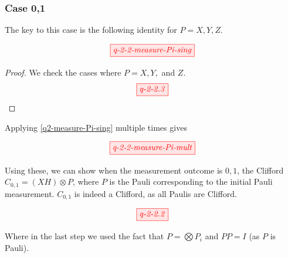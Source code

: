 \subsubsection{Case 0,1}

The key to this case is the following identity for $P = X, Y, Z$.

\begin{dmath}\label{q2-measure-Pi-sing}
	\tikzfig{q-2-2-measure-Pi-sing}
\end{dmath}

\begin{proof}
	We check the cases where $P = X, Y, $ and $Z$.
\begin{align*}
	\tikzfig{q-2-2.3}
\end{align*}
\end{proof}

Applying \eqref{q2-measure-Pi-sing} multiple times gives

\begin{dmath}\label{q2-measure-Pi-mult}
	\tikzfig{q-2-2-measure-Pi-mult}
\end{dmath}


Using these, we can show when the measurement outcome is $0,1$, the Clifford $C_{0,1} = (X H) \otimes P$, where $P$ is the Pauli corresponding to the initial Pauli measurement.
$C_{0, 1}$ is indeed a Clifford, as all Paulis are Clifford.

\begin{align*}
	\tikzfig{q-2-2.2}
\end{align*}

Where in the last step we used the fact that $P = \bigotimes P_i$ and $PP = I$ (as $P$ is Pauli).



